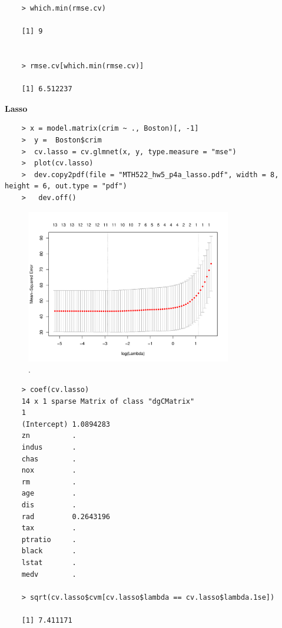 \documentclass{article}
\begin{document}
\begin{program}
	\begin{verbatim}
	> which.min(rmse.cv)

	[1] 9
	
	
	> rmse.cv[which.min(rmse.cv)]

	[1] 6.512237
	\end{verbatim}
\end{program}

\newpage


{\bf Lasso}

\begin{program}
	\begin{verbatim}
	> x = model.matrix(crim ~ ., Boston)[, -1]
	>  y =  Boston$crim
	>  cv.lasso = cv.glmnet(x, y, type.measure = "mse")
	>  plot(cv.lasso)
	>  dev.copy2pdf(file = "MTH522_hw5_p4a_lasso.pdf", width = 8, height = 6, out.type = "pdf")
	>   dev.off()
	\end{verbatim}
\end{program}

\newpage

\begin{figure}[htb]
	\begin{center}
		\includegraphics[width=0.8\textwidth]{MTH522_hw5_p4a_lasso.pdf}
	\end{center}
	\caption{.}
	\label{fig:MTH522_hw5_p4a_lasso}
\end{figure}


\begin{program}
	\begin{verbatim}
	> coef(cv.lasso)
	14 x 1 sparse Matrix of class "dgCMatrix"
	1
	(Intercept) 1.0894283
	zn          .        
	indus       .        
	chas        .        
	nox         .        
	rm          .        
	age         .        
	dis         .        
	rad         0.2643196
	tax         .        
	ptratio     .        
	black       .        
	lstat       .        
	medv        .        	

	> sqrt(cv.lasso$cvm[cv.lasso$lambda == cv.lasso$lambda.1se])

	[1] 7.411171
	\end{verbatim}
\end{program}
\end{document}
